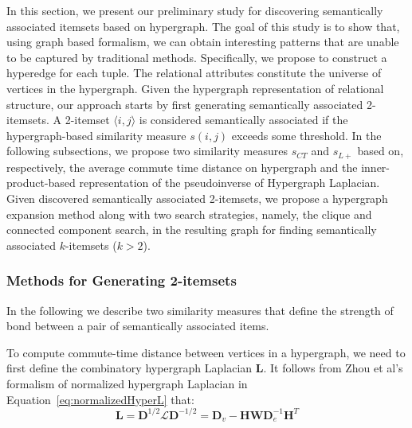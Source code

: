 In this section, we present our preliminary study for discovering semantically associated itemsets based on hypergraph. The goal of this study is to show that, using graph based formalism, we can obtain interesting patterns that are unable to be captured by traditional methods. Specifically, we propose to construct a hyperedge for each tuple. The relational attributes constitute the universe of vertices in the hypergraph. Given the hypergraph representation of relational structure, our approach starts by first generating semantically associated 2-itemsets. A 2-itemset $\langle i,j \rangle$ is considered semantically associated if the hypergraph-based similarity measure $s(i,j)$ exceeds some threshold. In the following subsections, we propose two similarity measures $s_{CT}$ and $s_{L+}$ based on, respectively, the average commute time distance on hypergraph and the inner-product-based representation of the pseudoinverse of Hypergraph Laplacian. Given discovered semantically associated 2-itemsets, we propose a hypergraph expansion method along with two search strategies, namely, the clique and connected component search, in the resulting graph for finding semantically associated $k$-itemsets ($k>2$).

\subsubsection{Methods for Generating 2-itemsets}
In the following we describe two similarity measures that define the strength of bond between a pair of semantically associated items.

To compute commute-time distance between vertices in a hypergraph, we need to first define the combinatory hypergraph Laplacian $\mathbf{L}$.
It follows from Zhou et al's formalism of normalized hypergraph Laplacian in Equation~\ref{eq:normalizedHyperL} that:
\begin{equation}
\mathbf{L}=\mathbf{D}^{1/2}\mathcal{L}\mathbf{D}^{-1/2}=\mathbf{D}_v-\mathbf{HWD}_e^{-1}\mathbf{H}^T \label{eq:combinatoryHyperL}
\end{equation}

